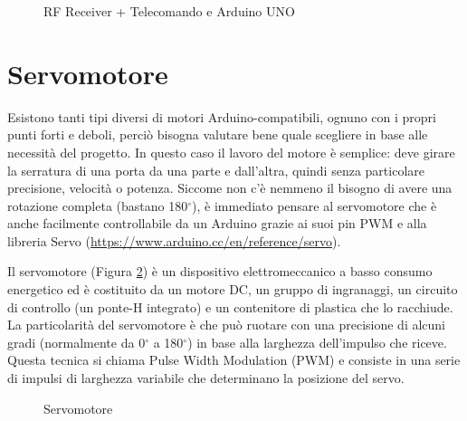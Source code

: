 \documentclass[12pt]{report}
\begin{document}
\begin{figure}
	\caption{RF Receiver + Telecomando e Arduino UNO}
	\label{fig:rf_uno}
\end{figure}

\pagebreak

%
\section{Servomotore}\label{sec:servomotore}
%

Esistono tanti tipi diversi di motori Arduino-compatibili, ognuno con i propri punti forti e deboli, perciò bisogna valutare bene quale scegliere in base alle necessità del progetto. In questo caso il lavoro del motore è semplice: deve girare la serratura di una porta da una parte e dall'altra, quindi senza particolare precisione, velocità o potenza. Siccome non c'è nemmeno il bisogno di avere una rotazione completa (bastano 180$^{\circ}$), è immediato pensare al servomotore che è anche facilmente controllabile da un Arduino grazie ai suoi pin PWM e alla libreria Servo (\url{https://www.arduino.cc/en/reference/servo}).

Il servomotore (Figura \ref{fig:servo}) è un dispositivo elettromeccanico a basso consumo energetico ed è costituito da un motore DC, un gruppo di ingranaggi, un circuito di controllo (un ponte-H integrato) e un contenitore di plastica che lo racchiude.
La particolarità del servomotore è che può ruotare con una precisione di alcuni gradi (normalmente da 0$^{\circ}$ a 180$^{\circ}$) in base alla larghezza dell'impulso che riceve. Questa tecnica si chiama Pulse Width Modulation (PWM) e consiste in una serie di impulsi di larghezza variabile che determinano la posizione del servo.


\begin{figure}
	\caption{Servomotore}
	\label{fig:servo}
\end{figure}
\end{document}
